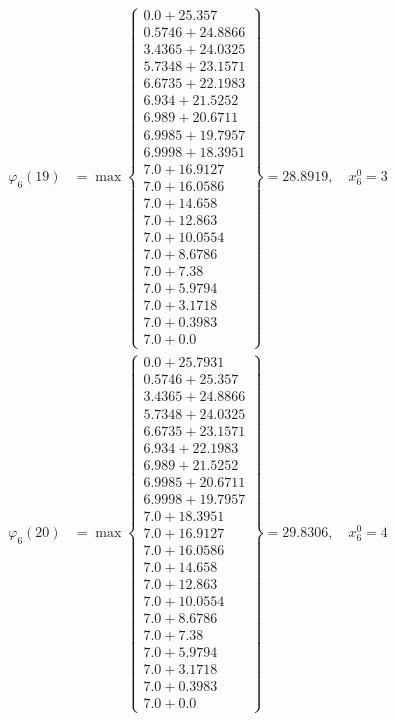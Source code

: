 \documentclass{article}
\begin{document}
\begin{align*}
  
  
  
\varphi_{6}(19) &= \max \left\{ \begin{array}{c}
0.0 + 25.357 \\
 0.5746 + 24.8866 \\
 3.4365 + 24.0325 \\
 5.7348 + 23.1571 \\
 6.6735 + 22.1983 \\
 6.934 + 21.5252 \\
 6.989 + 20.6711 \\
 6.9985 + 19.7957 \\
 6.9998 + 18.3951 \\
 7.0 + 16.9127 \\
 7.0 + 16.0586 \\
 7.0 + 14.658 \\
 7.0 + 12.863 \\
 7.0 + 10.0554 \\
 7.0 + 8.6786 \\
 7.0 + 7.38 \\
 7.0 + 5.9794 \\
 7.0 + 3.1718 \\
 7.0 + 0.3983 \\
 7.0 + 0.0
\end{array} \right\}=28.8919,\quad x_{6}^0=3\\
  
  
  
  
\varphi_{6}(20) &= \max \left\{ \begin{array}{c}
0.0 + 25.7931 \\
 0.5746 + 25.357 \\
 3.4365 + 24.8866 \\
 5.7348 + 24.0325 \\
 6.6735 + 23.1571 \\
 6.934 + 22.1983 \\
 6.989 + 21.5252 \\
 6.9985 + 20.6711 \\
 6.9998 + 19.7957 \\
 7.0 + 18.3951 \\
 7.0 + 16.9127 \\
 7.0 + 16.0586 \\
 7.0 + 14.658 \\
 7.0 + 12.863 \\
 7.0 + 10.0554 \\
 7.0 + 8.6786 \\
 7.0 + 7.38 \\
 7.0 + 5.9794 \\
 7.0 + 3.1718 \\
 7.0 + 0.3983 \\
 7.0 + 0.0
\end{array} \right\}=29.8306,\quad x_{6}^0=4\\
  

\end{align*}
\end{document}
